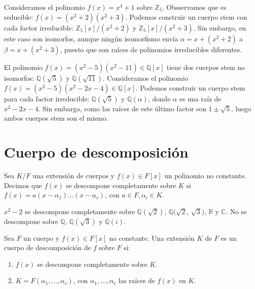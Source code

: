 \begin{example}
    Consideramos el polinomio $f(x) = x^4 + 1$ sobre $\mathbb{Z}_5$.
    Obsservamos que es reducible: $f(x) = (x^2+2)(x^2+3)$.
    Podemos construir un cuerpo stem con cada factor irreducible: $\mathbb{Z}_5[x]/(x^2+2)$ y $\mathbb{Z}_5[x]/(x^2+3)$.
    Sin embargo, en este caso son isomorfos, aunque ningún isomorfismo envía $\alpha = x + (x^2+2)$ a $\beta = x + (x^2+3)$, puesto que son raíces de polinomios irreducibles diferentes.
\end{example}

\begin{example}
    El polinomio $f(x) = (x^2-5)(x^2-11) \in \mathbb{Q}[x]$ tiene dos cuerpos stem no isomorfos: $\mathbb{Q}(\sqrt{5})$ y $\mathbb{Q}(\sqrt{11})$.
    Consideramos el polinomio $f(x) = (x^2-5)(x^2-2x-4) \in \mathbb{Q}[x]$. Podemos construir un cuerpo stem para cada factor irreducible: $\mathbb{Q}(\sqrt{5})$ y $\mathbb{Q}(\alpha)$, donde $\alpha$ es una raíz de $x^2-2x-4$.
    Sin embargo, como las raíces de este último factor son $1 \pm \sqrt{5}$, luego ambos cuerpos stem son el mismo.
\end{example}

\section{Cuerpo de descomposición}

\begin{definition}
    Sea $K/F$ una extensión de cuerpos y $f(x) \in F[x]$ un polinomio no constante.
    Decimos que $f(x)$ se descompone completamente sobre $K$ si $f(x) = a(x-\alpha_1) \dots (x-\alpha_r)$, con $a \in F, \alpha_i \in K$.
\end{definition}

\begin{example}
    $x^2 - 2$ se descompone completamente sobre $\mathbb{Q}(\sqrt{2})$, $\mathbb{Q}(\sqrt{2}$, $\sqrt{3})$, $\mathbb{R}$ y $\mathbb{C}$.
    No se descompone sobre $\mathbb{Q}$, $\mathbb{Q}(\sqrt{3})$ y $\mathbb{Q}(i)$.
\end{example}

\begin{definition}
    Sea $F$ un cuerpo y $f(x) \in F[x]$ no constante. Una extensión $K$ de $F$ es un cuerpo de descomposición de $f$ sobre $F$ si:
    \begin{enumerate}
        \item $f(x)$ se descompone completamente sobre $K$.
        \item $K = F(\alpha_1, \dots, \alpha_r)$, con $\alpha_1, \dots, \alpha_r$ las raíces de $f(x)$ en $K$.
    \end{enumerate}
\end{definition}

